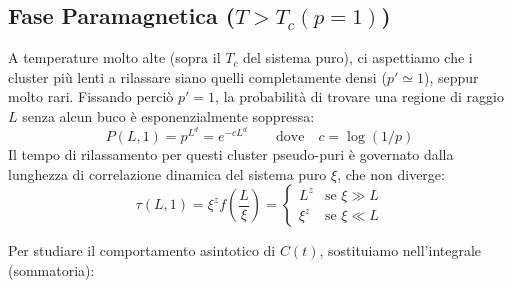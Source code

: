 \subsection{Fase Paramagnetica ($T > T_c(p=1)$)}
A temperature molto alte (sopra il $T_c$ del sistema puro), ci aspettiamo che i cluster più lenti a rilassare siano quelli completamente densi ($p' \simeq 1$), seppur molto rari. Fissando perciò $p' = 1$, la probabilità di trovare una regione di raggio $L$ senza alcun buco è esponenzialmente soppressa:
\begin{equation}
    P(L, 1) = p^{L^d} = e^{-c L^d} \qquad \text{dove} \quad c = \log(1/p)
\end{equation}
Il tempo di rilassamento per questi cluster pseudo-puri è governato dalla lunghezza di correlazione dinamica del sistema puro $\xi$, che non diverge:
\begin{equation}
    \tau(L, 1) = \xi^z f\left( \frac{L}{\xi} \right) = 
    \begin{cases}
        L^z & \text{se } \xi \gg L \\
        \xi^z & \text{se } \xi \ll L
    \end{cases}
\end{equation}




Per studiare il comportamento asintotico di $C(t)$, sostituiamo nell'integrale (sommatoria):

